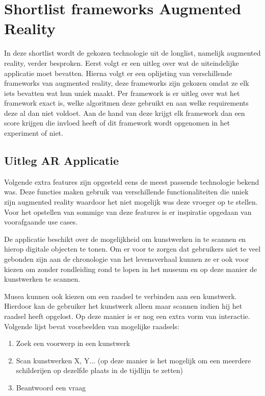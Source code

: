 \chapter{Shortlist frameworks Augmented Reality}
\label{ch:shortlist}

In deze shortlist wordt de gekozen technologie uit de longlist, namelijk augmented reality, verder besproken.
Eerst volgt er een uitleg over wat de uiteindelijke applicatie moet bevatten.
Hierna volgt er een oplijsting van verschillende frameworks van augmented reality, deze frameworks zijn gekozen omdat ze elk iets bevatten wat hun uniek maakt. Per framework is er uitleg over wat het framework exact is, welke algoritmen deze gebruikt en aan welke requirements deze al dan niet voldoet. Aan de hand van deze krijgt elk framework dan een score krijgen die invloed heeft of dit framework wordt opgenomen in het experiment of niet.

\section{Uitleg AR Applicatie}\label{sec:arrequirements}
Volgende extra features zijn opgesteld eens de meest passende technologie bekend was. Deze functies maken gebruik van verschillende functionaliteiten die uniek zijn augmented reality waardoor het niet mogelijk was deze vroeger op te stellen.  Voor het opstellen van sommige van deze features is er inspiratie opgedaan van voorafgaande use cases.

De applicatie beschikt over de mogelijkheid om kunstwerken in te scannen en hierop digitale objecten te tonen. 
Om er voor te zorgen dat gebruikers niet te veel gebonden zijn aan de chronologie van het levensverhaal kunnen ze er ook voor kiezen om zonder rondleiding rond te lopen in het museum en op deze manier de kunstwerken te scannen.

Musea kunnen ook kiezen om een raadsel te verbinden aan een kunstwerk. Hierdoor kan de gebruiker het kunstwerk alleen maar scannen indien hij het raadsel heeft opgelost. Op deze manier is er nog een extra vorm van interactie. Volgende lijst bevat voorbeelden van mogelijke raadsels: 

\begin{enumerate}
    \item Zoek een voorwerp in een kunstwerk
    \item Scan kunstwerken X, Y... (op deze manier is het mogelijk om een meerdere schilderijen op dezelfde plaats in de tijdlijn te zetten)
    \item Beantwoord een vraag
\end{enumerate}

